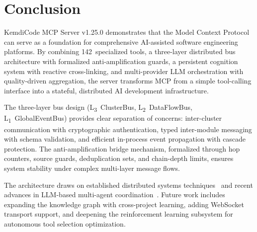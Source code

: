 \documentclass[journal,10pt]{IEEEtran}
\newcommand{\layerthree}{L\textsubscript{3}}
\newcommand{\layertwo}{L\textsubscript{2}}
\newcommand{\layerone}{L\textsubscript{1}}
\begin{document}
\section{Conclusion}
\label{sec:conclusion}

KemdiCode MCP Server v1.25.0 demonstrates that the Model Context Protocol can serve as a foundation for comprehensive AI-assisted software engineering platforms. By combining 142~specialized tools, a three-layer distributed bus architecture with formalized anti-amplification guards, a persistent cognition system with reactive cross-linking, and multi-provider LLM orchestration with quality-driven aggregation, the server transforms MCP from a simple tool-calling interface into a stateful, distributed AI development infrastructure.

The three-layer bus design (\layerthree~ClusterBus, \layertwo~DataFlowBus, \layerone~GlobalEventBus) provides clear separation of concerns: inter-cluster communication with cryptographic authentication, typed inter-module messaging with schema validation, and efficient in-process event propagation with cascade protection. The anti-amplification bridge mechanism, formalized through hop counters, source guards, deduplication sets, and chain-depth limits, ensures system stability under complex multi-layer message flows.

The architecture draws on established distributed systems techniques~\cite{lamport1978,bloom1970} and recent advances in LLM-based multi-agent coordination~\cite{li2024multiagent,guo2024ijcai}. Future work includes expanding the knowledge graph with cross-project learning, adding WebSocket transport support, and deepening the reinforcement learning subsystem for autonomous tool selection optimization.
\end{document}
